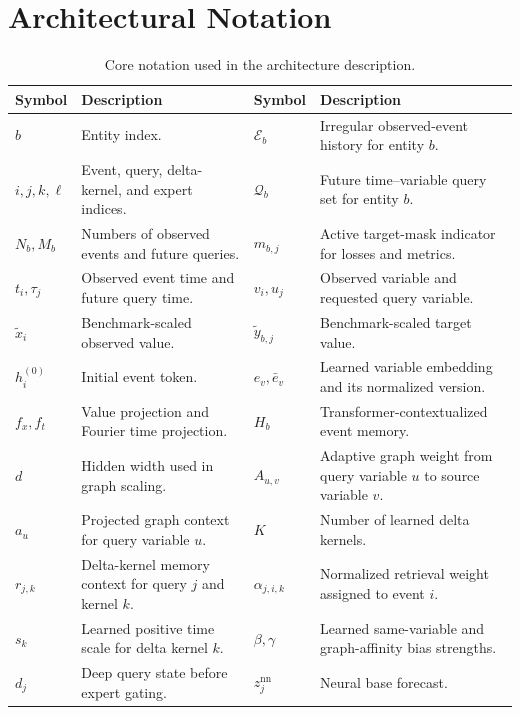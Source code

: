 \documentclass[preprint,12pt]{elsarticle}
\begin{document}
\clearpage
\appendix
\section{Architectural Notation}
\label{app:adept-symbols}

\begin{table}[!htbp]
\caption{Core notation used in the \method{} architecture description.}
\label{tab:adept-symbols}
\centering
\scriptsize
\setlength{\tabcolsep}{3pt}
\renewcommand{\arraystretch}{0.94}
\begin{tabular}{p{}p{}p{}p{}}
\toprule
Symbol & Description & Symbol & Description \\
\midrule
$b$ & Entity index. &
$\mathcal E_b$ & Irregular observed-event history for entity $b$. \\
$i,j,k,\ell$ & Event, query, delta-kernel, and expert indices. &
$\mathcal Q_b$ & Future time--variable query set for entity $b$. \\
$N_b,M_b$ & Numbers of observed events and future queries. &
$m_{b,j}$ & Active target-mask indicator for losses and metrics. \\
$t_i,\tau_j$ & Observed event time and future query time. &
$v_i,u_j$ & Observed variable and requested query variable. \\
$\widetilde x_i$ & Benchmark-scaled observed value. &
$\widetilde y_{b,j}$ & Benchmark-scaled target value. \\
\addlinespace
$h_i^{(0)}$ & Initial event token. &
$e_v,\bar e_v$ & Learned variable embedding and its normalized version. \\
$f_x,f_t$ & Value projection and Fourier time projection. &
$H_b$ & Transformer-contextualized event memory. \\
$d$ & Hidden width used in graph scaling. &
$A_{u,v}$ & Adaptive graph weight from query variable $u$ to source variable $v$. \\
$a_u$ & Projected graph context for query variable $u$. &
$K$ & Number of learned delta kernels. \\
$r_{j,k}$ & Delta-kernel memory context for query $j$ and kernel $k$. &
$\alpha_{j,i,k}$ & Normalized retrieval weight assigned to event $i$. \\
$s_k$ & Learned positive time scale for delta kernel $k$. &
$\beta,\gamma$ & Learned same-variable and graph-affinity bias strengths. \\
\addlinespace
$d_j$ & Deep query state before expert gating. &
$z^{\mathrm{nn}}_j$ & Neural base forecast. \\

\end{tabular}
\end{table}
\end{document}
